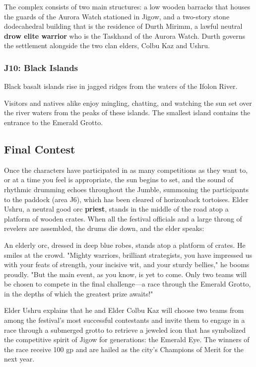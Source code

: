 \documentclass[10pt,a4paper,twoside,bg=print,twocolumn,openany,nodeprecatedcode]{dndbook}
\begin{document}
The complex consists of two main structures: a low wooden barracks that houses the guards of the Aurora Watch stationed in Jigow, and a two-story stone dodecahedral building that is the residence of Durth Mirimm, a lawful neutral \textbf{drow elite warrior} who is the Taskhand of the Aurora Watch. Durth governs the settlement alongside the two clan elders, Colbu Kaz and Ushru.

\subsubsection{J10: Black Islands}
\begin{DndReadAloud}{}
Black basalt islands rise in jagged ridges from the waters of the Ifolon River.

\end{DndReadAloud}

Visitors and natives alike enjoy mingling, chatting, and watching the sun set over the river waters from the peaks of these islands. The smallest island contains the entrance to the Emerald Grotto.

\subsection{Final Contest}
Once the characters have participated in as many competitions as they want to, or at a time you feel is appropriate, the sun begins to set, and the sound of rhythmic drumming echoes throughout the Jumble, summoning the participants to the paddock (area J6), which has been cleared of horizonback tortoises. Elder Ushru, a neutral good orc \textbf{priest}, stands in the middle of the road atop a platform of wooden crates. When all the festival officials and a large throng of revelers are assembled, the drums die down, and the elder speaks:

\begin{DndReadAloud}{}
An elderly orc, dressed in deep blue robes, stands atop a platform of crates. He smiles at the crowd. "Mighty warriors, brilliant strategists, you have impressed us with your feats of strength, your incisive wit, and your sturdy bellies," he booms proudly. "But the main event, as you know, is yet to come. Only two teams will be chosen to compete in the final challenge—a race through the Emerald Grotto, in the depths of which the greatest prize awaits!"

\end{DndReadAloud}

Elder Ushru explains that he and Elder Colbu Kaz will choose two teams from among the festival's most successful contestants and invite them to engage in a race through a submerged grotto to retrieve a jeweled icon that has symbolized the competitive spirit of Jigow for generations: the Emerald Eye. The winners of the race receive 100 gp and are hailed as the city's Champions of Merit for the next year.
\end{document}

